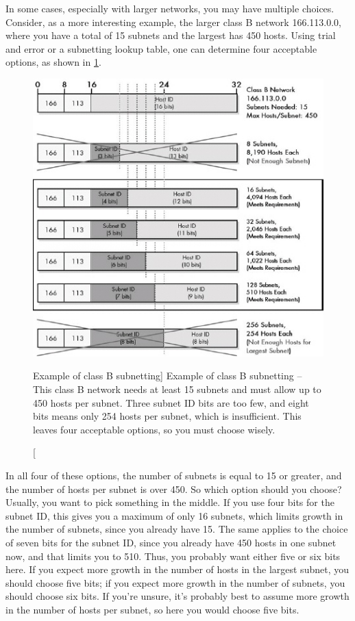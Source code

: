 In some cases, especially with larger networks, you may have multiple choices.
Consider, as a more interesting example, the larger class B network 166.113.0.0, where you have a total of 15 subnets and the largest has 450 hosts.
Using trial and error or a subnetting lookup table, one can determine four acceptable options, as shown in \cref{fig:subnetting-class-b-options}.


\begin{figure}
   \centering
   \includegraphics[width=.8\textwidth]{images/subnetting-class-b-options.jpg}
   \caption
      [Example of class B subnetting]
      {Example of class B subnetting --
      This class B network needs at least 15 subnets and must allow up to 450 hosts per subnet.
      Three subnet ID bits are too few, and eight bits means only 254 hosts per subnet, which is insufficient.
      This leaves four acceptable options, so you must choose wisely.}
   \label{fig:subnetting-class-b-options}
\end{figure}


In all four of these options, the number of subnets is equal to 15 or greater, and the number of hosts per subnet is over 450.
So which option should you choose?
Usually, you want to pick something in the middle.
If you use four bits for the subnet ID, this gives you a maximum of only 16 subnets, which limits growth in the number of subnets, since you already have 15.
The same applies to the choice of seven bits for the subnet ID, since you already have 450 hosts in one subnet now, and that limits you to 510.
Thus, you probably want either five or six bits here.
If you expect more growth in the number of hosts in the largest subnet, you
should choose five bits; if you expect more growth in the number of
subnets, you should choose six bits. If you're unsure, it's probably
best to assume more growth in the number of hosts per subnet, so here you would choose five bits.

